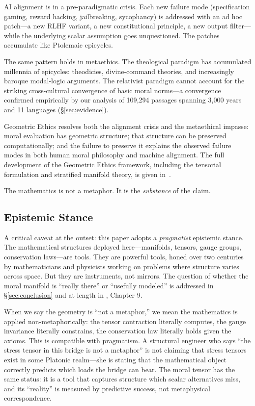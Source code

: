 \documentclass[12pt,letterpaper]{article}
\theoremstyle{definition}
\theoremstyle{remark}
\begin{document}
AI alignment is in a pre-paradigmatic crisis. Each new failure mode (specification gaming, reward hacking, jailbreaking, sycophancy) is addressed with an ad hoc patch---a new RLHF variant, a new constitutional principle, a new output filter---while the underlying scalar assumption goes unquestioned. The patches accumulate like Ptolemaic epicycles.

The same pattern holds in metaethics. The theological paradigm has accumulated millennia of epicycles: theodicies, divine-command theories, and increasingly baroque modal-logic arguments. The relativist paradigm cannot account for the striking cross-cultural convergence of basic moral norms---a convergence confirmed empirically by our analysis of 109,294 passages spanning 3,000 years and 11 languages (\S\ref{sec:evidence}).

Geometric Ethics resolves both the alignment crisis and the metaethical impasse: moral evaluation has geometric structure; that structure can be preserved computationally; and the failure to preserve it explains the observed failure modes in both human moral philosophy and machine alignment. The full development of the Geometric Ethics framework, including the tensorial formulation and stratified manifold theory, is given in~\cite{bond2026geometric}.

The mathematics is not a metaphor. It is the \emph{substance} of the claim.

\subsection{Epistemic Stance}

A critical caveat at the outset: this paper adopts a \emph{pragmatist} epistemic stance. The mathematical structures deployed here---manifolds, tensors, gauge groups, conservation laws---are tools. They are powerful tools, honed over two centuries by mathematicians and physicists working on problems where structure varies across space. But they are instruments, not mirrors. The question of whether the moral manifold is ``really there'' or ``usefully modeled'' is addressed in \S\ref{sec:conclusion} and at length in \cite{bond2026geometric}, Chapter 9.

When we say the geometry is ``not a metaphor,'' we mean the mathematics is applied non-metaphorically: the tensor contraction literally computes, the gauge invariance literally constrains, the conservation law literally holds given the axioms. This is compatible with pragmatism. A structural engineer who says ``the stress tensor in this bridge is not a metaphor'' is not claiming that stress tensors exist in some Platonic realm---she is stating that the mathematical object correctly predicts which loads the bridge can bear. The moral tensor has the same status: it is a tool that captures structure which scalar alternatives miss, and its ``reality'' is measured by predictive success, not metaphysical correspondence.
\end{document}
